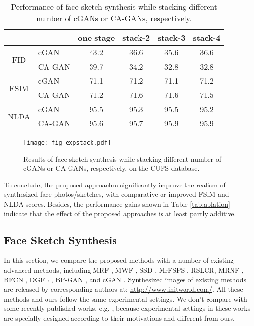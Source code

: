 \documentclass[journal]{IEEEtran}
\begin{document}
\begin{table}
\centering
\caption{Performance of face sketch synthesis while stacking different number of cGANs or CA-GANs, respectively.}
\label{tab:exp_stack}
\begin{tabular}{c|l|cccc}
\toprule											
	&		&	one stage	&	stack-2	&	stack-3	&	stack-4	\\
\midrule											
\multirow{2}{*}{FID}	&	cGAN	&	43.2	&	36.6	&	35.6	&	36.6	\\
	&	CA-GAN	&	39.7	&	34.2	&	32.8	&	32.8	\\
\midrule											
\multirow{2}{*}{FSIM}	&	cGAN	&	71.1	&	71.2	&	71.1	&	71.2	\\
	&	CA-GAN	&	71.2	&	71.6	&	71.6	&	71.5	\\
\midrule											
\multirow{2}{*}{NLDA}	&	cGAN	&	95.5	&	95.3	&	95.5	&	95.2	\\
	&	CA-GAN	&	95.6	&	95.7	&	95.9	&	95.9	\\
\bottomrule	
\end{tabular}
\vspace{-0.5cm}
\end{table}




\begin{figure}
\centering
\texttt{[image: fig\_expstack.pdf]}
\vspace{-0.4cm}
\caption{Results of face sketch synthesis while stacking different number of cGANs or CA-GANs, respectively, on the CUFS database.}
\label{fig:exp_stack}
\vspace{-0.4cm}
\end{figure}
										

To conclude, the proposed approaches significantly improve the realism of synthesized face photos/sketches, with comparative or improved FSIM and NLDA scores. Besides, the performance gains shown in Table \ref{tab:ablation} indicate that the effect of the proposed approaches is at least partly additive.







\subsection{Face Sketch Synthesis}
\label{sec:photo2sketch}

In this section, we compare the proposed methods with a number of existing advanced methods, including MRF \cite{Wang2009Face}, MWF \cite{MWF}, SSD \cite{Song2014Real}, MrFSPS \cite{Peng2016Multiple}, RSLCR\cite{Wang2017RSLCR}, MRNF \cite{Zhang2018Markov}, BFCN \cite{BFCN}, DGFL \cite{Zhu2017Deep}, BP-GAN \cite{wang2017bpgan}, and cGAN \cite{Isola2017Pix2Pix}. Synthesized images of existing methods are released by corresponding authors at: \url{http://www.ihitworld.com/}. All these methods and ours follow the same experimental settings. We don't compare with some recently published works, e.g. \cite{Zhang2018IJCAI,Peng2019DeepPGM,Zhang2019TIP,Zhu2019ColGAN,Zhang2019MAL,Zhang2019TCYB}, because experimental settings in these works are specially designed according to their motivations and different from ours.
\end{document}
